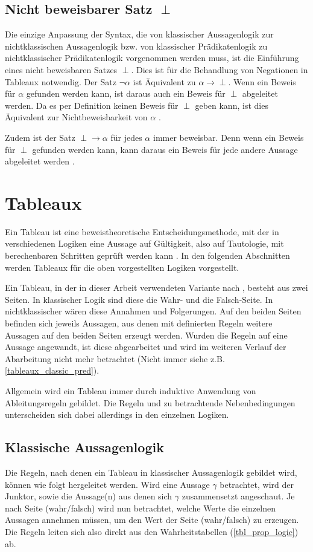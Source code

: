 \subsection{\label{intu_non_proof_sentence}Nicht beweisbarer Satz $\perp$}
Die einzige Anpassung der Syntax, die von klassischer Aussagenlogik zur nichtklassischen Aussagenlogik bzw. von klassischer Prädikatenlogik zu nichtklassischer Prädikatenlogik vorgenommen werden muss, ist die Einführung eines nicht beweisbaren Satzes $\perp$. Dies ist für die Behandlung von Negationen in Tableaux notwendig. Der Satz $\neg\alpha$ ist Äquivalent zu $\alpha\rightarrow\perp$. Wenn ein Beweis für $\alpha$ gefunden werden kann, ist daraus auch ein Beweis für $\perp$ abgeleitet werden. Da es per Definition keinen Beweis für $\perp$ geben kann, ist dies Äquivalent zur Nichtbeweisbarkeit von $\alpha$ \cite{DGHP99}.

Zudem ist der Satz $\perp\rightarrow\alpha$ für jedes $\alpha$ immer beweisbar. Denn wenn ein Beweis für $\perp$ gefunden werden kann, kann daraus ein Beweis für jede andere Aussage abgeleitet werden \cite{DGHP99}.

\section{Tableaux}
Ein Tableau ist eine beweistheoretische Entscheidungsmethode, mit der in verschiedenen Logiken eine Aussage auf Gültigkeit, also auf Tautologie, mit berechenbaren Schritten geprüft werden kann \cite{DGHP99}. In den folgenden Abschnitten werden Tableaux für die oben vorgestellten Logiken vorgestellt.

Ein Tableau, in der in dieser Arbeit verwendeten Variante nach \cite{BK82}, besteht aus zwei Seiten. In klassischer Logik sind diese die Wahr- und die Falsch-Seite. In nichtklassischer wären diese Annahmen und Folgerungen. Auf den beiden Seiten befinden sich jeweils Aussagen, aus denen mit definierten Regeln weitere Aussagen auf den beiden Seiten erzeugt werden. Wurden die Regeln auf eine Aussage angewandt, ist diese abgearbeitet und wird im weiteren Verlauf der Abarbeitung nicht mehr betrachtet (Nicht immer siehe z.B. \ref{tableaux_classic_pred}).

Allgemein wird ein Tableau immer durch induktive Anwendung von Ableitungsregeln gebildet. Die Regeln und zu betrachtende Nebenbedingungen unterscheiden sich dabei allerdings in den einzelnen Logiken.

\subsection{Klassische Aussagenlogik}
Die Regeln, nach denen ein Tableau in klassischer Aussagenlogik gebildet wird, können wie folgt hergeleitet werden. Wird eine Aussage $\gamma$ betrachtet, wird der Junktor, sowie die Aussage(n) aus denen sich $\gamma$ zusammensetzt angeschaut. Je nach Seite (wahr/falsch) wird nun betrachtet, welche Werte die einzelnen Aussagen annehmen müssen, um den Wert der Seite (wahr/falsch) zu erzeugen. Die Regeln leiten sich also direkt aus den Wahrheitstabellen (\ref{tbl_prop_logic}) ab.

